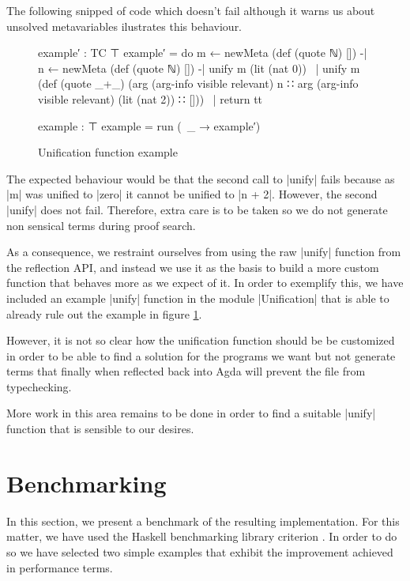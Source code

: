 \documentclass[a4paper]{article}
\begin{document}
The following snipped of code which doesn't fail although it warns us about
unsolved metavariables ilustrates this behaviour.

\begin{figure}[h]
\small
\begin{code}
    example′ : TC ⊤
    example′ =
      do m ← newMeta (def (quote ℕ) [])
      -| n ← newMeta (def (quote ℕ) [])
      -| unify m (lit (nat 0))
      ~| unify m (def (quote _+_)
                 (arg (arg-info visible relevant) n ∷
                 arg (arg-info visible relevant) (lit (nat 2)) ∷ []))
      ~| return tt

    example : ⊤
    example = run (\ _ → example′)
\end{code}
  \label{fig:examplebad}
  \caption{Unification function example}
\end{figure}

The expected behaviour would be that the second call to |unify| fails because as
|m| was unified to |zero| it cannot be unified to |n + 2|. However, the second
|unify| does not fail. Therefore, extra care is to be taken so we do not
generate non sensical terms during proof search.

As a consequence, we restraint ourselves from using the raw |unify| function
from the reflection API, and instead we use it as the basis to build a more
custom function that behaves more as we expect of it. In order to exemplify
this, we have included an example |unify| function in the module |Unification|
that is able to already rule out the example in figure \ref{fig:examplebad}.

However, it is not so clear how the unification function should be be customized
in order to be able to find a solution for the programs we want but not generate
terms that finally when reflected back into Agda will prevent the file from
typechecking.

More work in this area remains to be done in order to find a suitable |unify|
function that is sensible to our desires.

\section{Benchmarking}
\label{sec:benchmark}

In this section, we present a benchmark of the resulting implementation. For
this matter, we have used the Haskell benchmarking library criterion
. In order to do so we
have selected two simple examples that exhibit the improvement achieved in
performance terms.
\end{document}
